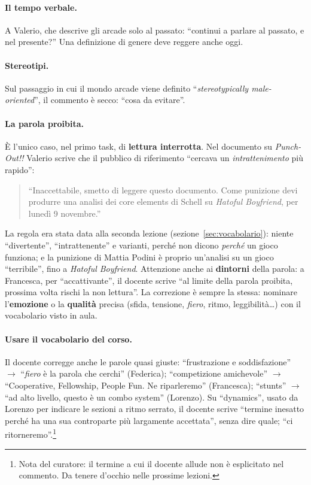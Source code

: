 \paragraph{Il tempo verbale.} A Valerio, che descrive gli arcade solo al
passato: ``continui a parlare al passato, e nel presente?'' Una definizione
di genere deve reggere anche oggi.

\paragraph{Stereotipi.} Sul passaggio in cui il mondo arcade viene
definito ``\emph{stereotypically male-oriented}'', il commento è secco: ``cosa da evitare''.

\paragraph{La parola proibita.} È l'unico caso, nel primo task, di
\textbf{lettura interrotta}. Nel documento su \emph{Punch-Out!!} Valerio
scrive che il pubblico di riferimento ``cercava un \emph{intrattenimento} più
rapido'':
\begin{quote}
  ``Inaccettabile, smetto di leggere questo documento. Come punizione devi
  produrre una analisi dei core elements di Schell su \emph{Hatoful
  Boyfriend}, per lunedì 9 novembre.''
\end{quote}
La regola era stata data alla seconda lezione
(sezione~\ref{sec:vocabolario}): niente ``divertente'', ``intrattenente'' e
varianti, perché non dicono \emph{perché} un gioco funziona; e la punizione di
Mattia Podini è proprio un'analisi su un gioco ``terribile'', fino a
\emph{Hatoful Boyfriend}. Attenzione anche ai \textbf{dintorni} della parola:
a Francesca, per ``accattivante'', il docente scrive ``al limite della parola
proibita, prossima volta rischi la non lettura''. La correzione è sempre la
stessa: nominare l'\textbf{emozione} o la \textbf{qualità} precisa (sfida,
tensione, \emph{fiero}, ritmo, leggibilità\dots) con il vocabolario visto in
aula.

\paragraph{Usare il vocabolario del corso.} Il docente corregge anche le
parole quasi giuste: ``frustrazione e soddisfazione'' $\rightarrow$
``\emph{fiero} è la parola che cerchi'' (Federica); ``competizione
amichevole'' $\rightarrow$ ``Cooperative, Fellowship, People Fun. Ne
riparleremo'' (Francesca); ``stunts'' $\rightarrow$ ``ad alto livello, questo
è un combo system'' (Lorenzo). Su ``dynamics'', usato da Lorenzo per indicare
le sezioni a ritmo serrato, il docente scrive ``termine inesatto perché ha
una sua controparte più largamente accettata'', senza dire quale; ``ci
ritorneremo''.\footnote{Nota del curatore: il termine a cui il docente
allude non è esplicitato nel commento. Da tenere d'occhio nelle prossime
lezioni.}

